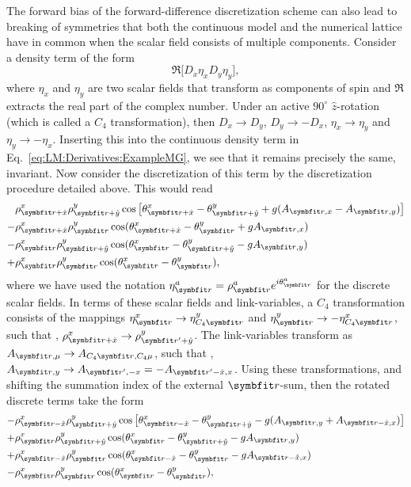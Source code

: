 The forward bias of the forward-difference discretization scheme can also lead to breaking of symmetries that both the continuous model and the
numerical lattice have in common when the scalar field consists of multiple components. Consider a density term of the form
\begin{equation}
    \label{eq:LM:Derivatives:ExampleMG}
    \Re\Big[D_x\eta_xD_y\eta_y\Big],
\end{equation}
where $\eta_x$ and $\eta_y$ are two scalar fields that transform as components of spin and $\Re$ extracts the real part of the complex number.
Under an active $90^\circ$ $\hat{z}$-rotation
(which is called a $C_4$ transformation), then
$D_x\to D_y$, $D_y\to -D_x$, $\eta_x\to \eta_y$ and $\eta_y\to -\eta_x$. Inserting this into the continuous density term in 
Eq.~\eqref{eq:LM:Derivatives:ExampleMG}, we see that it remains precisely the same, \ie invariant. Now consider the discretization of this term by
the discretization procedure detailed above. This would read
\begin{equation}
    \label{eq:LM:Derivatives:ExampleMG:Discrete}
    \begin{split}
        &\rho^x_{\v{r}+\hat{x}}\rho^y_{\v{r}+\hat{y}}\cos\big[\theta^x_{\v{r}+\hat{x}}-\theta^y_{\v{r}+\hat{y}}+g(A_{\v{r},x}-A_{\v{r},y})\big]\\
        - &\rho^x_{\v{r}+\hat{x}}\rho^y_\v{r}\cos(\theta^x_{\v{r}+\hat{x}} - \theta^y_\v{r} + gA_{\v{r},x})\\
        - &\rho^x_\v{r}\rho^y_{\v{r}+\hat{y}}\cos(\theta^x_\v{r}-\theta^y_{\v{r}+\hat{y}}-gA_{\v{r},y})\\
        + &\rho^x_\v{r}\rho^y_\v{r}\cos(\theta^x_\v{r}-\theta^y_\v{r}),
    \end{split}
\end{equation}
where we have used the notation $\eta^a_\v{r} = \rho^a_\v{r}e^{i\theta^a_\v{r}}$ for the discrete scalar fields. In terms of these scalar fields
and link-variables, a $C_4$ transformation consists of the mappings $\eta^x_\v{r}\to\eta^y_{C_4\v{r}}$ and $\eta^y_\v{r}\to-\eta^x_{C_4\v{r}}$,
such that \eg, $\rho^x_{\v{r}+\hat{x}} \to \rho^y_{\v{r}'+\hat{y}}$. The link-variables transform as $A_{\v{r},\mu}\to A_{C_4\v{r},C_4\mu}$, such
that \eg, $A_{\v{r},y}\to A_{\v{r}',-x}=-A_{\v{r}'-\hat{x},x}$. Using these transformations, and shifting the summation index of the 
external $\v{r}$-sum, then the rotated discrete terms take the form
\begin{equation}
    \label{eq:LM:Derivatives:ExampleMG:Discrete:Rotated}
    \begin{split}
        -&\rho^x_{\v{r}-\hat{x}}\rho^y_{\v{r}+\hat{y}}\cos\big[\theta^x_{\v{r}-\hat{x}}-\theta^y_{\v{r}+\hat{y}}-g(A_{\v{r},y}+A_{\v{r}-\hat{x},x})\big]\\
        +&\rho^x_\v{r}\rho^y_{\v{r}+\hat{y}}\cos(\theta^x_\v{r} - \theta^y_{\v{r}+\hat{y}}-gA_{\v{r},y})\\
        +&\rho^x_{\v{r}-\hat{x}}\rho^y_\v{r}\cos(\theta^x_{\v{r}-\hat{x}}-\theta^y_\v{r}-gA_{\v{r}-\hat{x},x})\\
        -&\rho^x_\v{r}\rho^y_\v{r}\cos(\theta^x_\v{r}-\theta^y_\v{r}),
    \end{split}
\end{equation}
